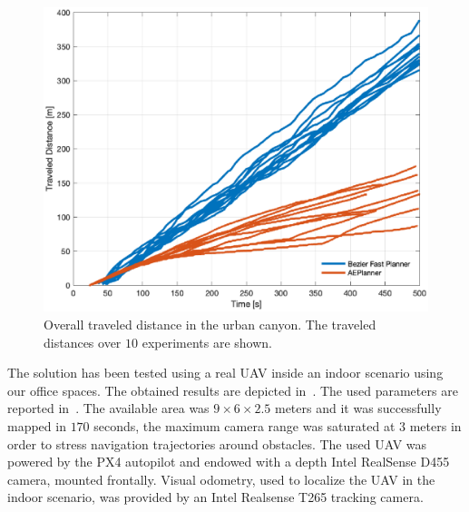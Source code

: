 \begin{figure}[!t]
	\centering
	\includegraphics[scale=.4]{Figs/Chapter4/traveled_distance.eps}
	\caption{Overall traveled distance in the urban canyon. The traveled distances over $10$ experiments are shown.}%
	\label{FIG:EXPLORATION-TRAVELLED-DISTANCE}
\end{figure}
The solution has been tested using a real UAV inside an indoor scenario using our office spaces.
The obtained results are depicted in~. The used parameters are reported
in~. The available area was $9\times6\times2.5$ meters and it was successfully
mapped in $170$ seconds, the maximum camera range was saturated at $3$ meters in order to stress navigation trajectories around
obstacles. The used UAV was powered by the PX4 autopilot and endowed with a depth Intel RealSense D455 camera, mounted frontally.
Visual odometry, used to localize the UAV in the indoor scenario, was provided by an Intel Realsense T265 tracking camera. 

